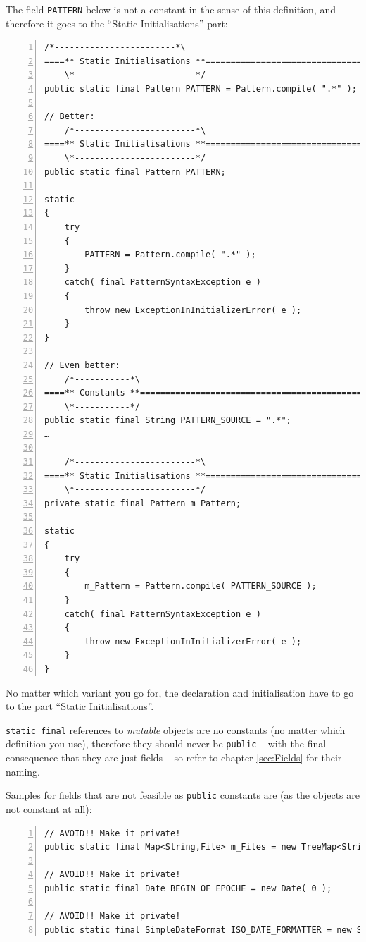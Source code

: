 \documentclass[11pt,a4paper, titlepage, parskip=half, headsepline, footsepline, cleardoublepage=current, headheight=1cm]{scrbook}
\newcommand*{\tqref}[1]{\hyperref[{#1}]{\ref*{#1}}}
\begin{document}
The field \lstinline|PATTERN| below is not a constant in the sense of this definition, and therefore it goes to the “Static Initialisations” part:
\begin{lstlisting}[numbers=left]
    /*------------------------*\
====** Static Initialisations **=====================================
    \*------------------------*/
public static final Pattern PATTERN = Pattern.compile( ".*" );

// Better:
    /*------------------------*\
====** Static Initialisations **=====================================
    \*------------------------*/
public static final Pattern PATTERN;

static
{
    try
    {
        PATTERN = Pattern.compile( ".*" );
    }
    catch( final PatternSyntaxException e )
    {
        throw new ExceptionInInitializerError( e );
    }    
}

// Even better:
    /*-----------*\
====** Constants **==================================================
    \*-----------*/
public static final String PATTERN_SOURCE = ".*";
…

    /*------------------------*\
====** Static Initialisations **=====================================
    \*------------------------*/
private static final Pattern m_Pattern;

static
{
    try
    {
        m_Pattern = Pattern.compile( PATTERN_SOURCE );
    }
    catch( final PatternSyntaxException e )
    {
        throw new ExceptionInInitializerError( e );
    }    
}
\end{lstlisting}
No matter which variant you go for, the declaration and initialisation have to go to the part “Static Initialisations”.

\lstinline|static final| references to \textit{mutable} objects are no constants (no matter which definition you use), therefore they should never be \lstinline|public| – with the final consequence that they are just fields – so refer to chapter \tqref{sec:Fields} for their naming.

Samples for fields that are not feasible as \lstinline|public| constants are (as the objects are not constant at all):
\begin{lstlisting}[numbers=left]
// AVOID!! Make it private!
public static final Map<String,File> m_Files = new TreeMap<String,File>();

// AVOID!! Make it private!
public static final Date BEGIN_OF_EPOCHE = new Date( 0 );

// AVOID!! Make it private!
public static final SimpleDateFormat ISO_DATE_FORMATTER = new SimpleDateFormat( ISO_DATE_FORMAT );
\end{lstlisting}
\end{document}

